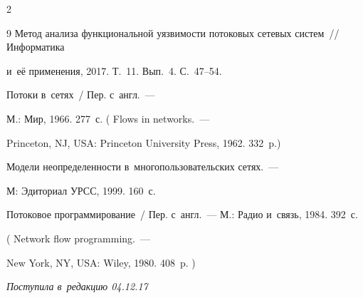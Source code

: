\begin{multicols}{2}
{{\begin{thebibliography}{9}
Метод анализа функциональной уязвимости потоковых сетевых систем~// Информатика 


и~её применения, 2017. Т.~11. Вып.~4. С.~47--54.





  Потоки в~сетях~/ Пер. с~англ.~--- 


М.: Мир, 1966. 277~с. ( Flows in networks.~--- 


Princeton, NJ, USA: Princeton University Press, 1962. 332~p.)





  


Модели неопределенности в~многопользовательских сетях.~--- 


М: Эдиториал УРСС, 1999. 160~с.





  


Потоковое программирование~/ Пер. с~англ.~--- М.: Радио и~связь, 1984. 392~с. 


( Network flow programming.~--- 


New York, NY, USA: Wiley, 1980. 408~p. )





 \end{thebibliography}





 }


 }





\end{multicols}





\vspace*{-6pt}





\hfill{\small\textit{Поступила в~редакцию 04.12.17}}





\vspace*{4pt}





